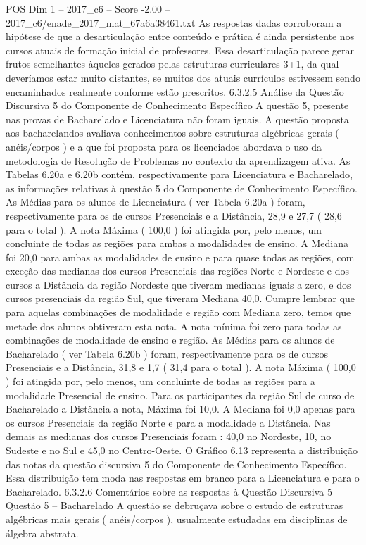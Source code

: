 \begin{textsample}{POS Dim 1 – 2017\_c6 – Score -2.00 – 2017\_c6/enade\_2017\_mat\_67a6a38461.txt}
As respostas dadas corroboram a hipótese de que a desarticulação entre conteúdo e prática é ainda persistente nos cursos atuais de formação inicial de professores.
Essa desarticulação parece gerar frutos semelhantes àqueles gerados pelas estruturas curriculares 3+1, da qual deveríamos estar muito distantes, se muitos dos atuais currículos estivessem sendo encaminhados realmente conforme estão prescritos. 6.3.2.5 Análise da Questão Discursiva 5 do Componente de Conhecimento Específico A questão 5, presente nas provas de Bacharelado e Licenciatura não foram iguais.
A questão proposta aos bacharelandos avaliava conhecimentos sobre estruturas algébricas gerais ( anéis/corpos ) e a que foi proposta para os licenciados abordava o uso da metodologia de Resolução de Problemas no contexto da aprendizagem ativa.
As Tabelas 6.20a e 6.20b contém, respectivamente para Licenciatura e Bacharelado, as informações relativas à questão 5 do Componente de Conhecimento Específico.
As Médias para os alunos de Licenciatura ( ver Tabela 6.20a ) foram, respectivamente para os de cursos Presenciais e a Distância, 28,9 e 27,7 ( 28,6 para o total ).
A nota Máxima ( 100,0 ) foi atingida por, pelo menos, um concluinte de todas as regiões para ambas a modalidades de ensino.
A Mediana foi 20,0 para ambas as modalidades de ensino e para quase todas as regiões, com exceção das medianas dos cursos Presenciais das regiões Norte e Nordeste e dos cursos a Distância da região Nordeste que tiveram medianas iguais a zero, e dos cursos presenciais da região Sul, que tiveram Mediana 40,0.
Cumpre lembrar que para aquelas combinações de modalidade e região com Mediana zero, temos que metade dos alunos obtiveram esta nota.
A nota mínima foi zero para todas as combinações de modalidade de ensino e região.
As Médias para os alunos de Bacharelado ( ver Tabela 6.20b ) foram, respectivamente para os de cursos Presenciais e a Distância, 31,8 e 1,7 ( 31,4 para o total ).
A nota Máxima ( 100,0 ) foi atingida por, pelo menos, um concluinte de todas as regiões para a modalidade Presencial de ensino.
Para os participantes da região Sul de curso de Bacharelado a Distância a nota, Máxima foi 10,0.
A Mediana foi 0,0 apenas para os cursos Presenciais da região Norte e para a modalidade a Distância.
Nas demais as medianas dos cursos Presenciais foram : 40,0 no Nordeste, 10, no Sudeste e no Sul e 45,0 no Centro-Oeste.
O Gráfico 6.13 representa a distribuição das notas da questão discursiva 5 do Componente de Conhecimento Específico.
Essa distribuição tem moda nas respostas em branco para a Licenciatura e para o Bacharelado. 6.3.2.6 Comentários sobre as respostas à Questão Discursiva 5 Questão 5 – Bacharelado A questão se debruçava sobre o estudo de estruturas algébricas mais gerais ( anéis/corpos ), usualmente estudadas em disciplinas de álgebra abstrata.

\end{textsample}
